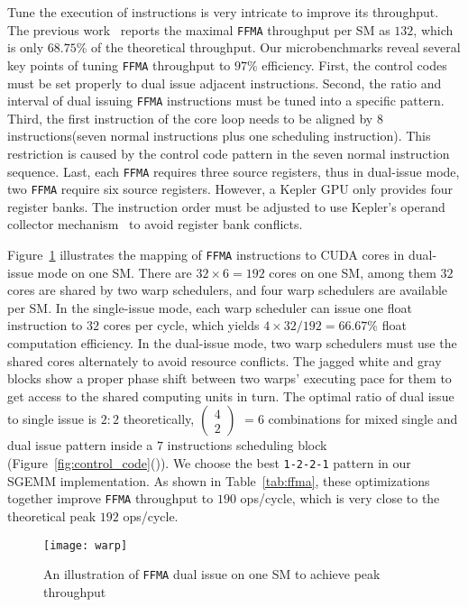 Tune the execution of instructions is very intricate to improve its throughput. 
The previous work~\cite{lai} reports the maximal {\tt FFMA} throughput per SM as $132$, which is only $68.75\%$ of the theoretical throughput. 
Our microbenchmarks reveal several key points of tuning {\tt FFMA} throughput to $97\%$ efficiency.
First, the control codes must be set properly to dual issue adjacent instructions. 
Second, the ratio and interval of dual issuing {\tt FFMA} instructions must be tuned into a specific pattern.
Third, the first instruction of the core loop needs to be aligned by 8 instructions(seven
normal instructions plus one scheduling instruction). This restriction
is caused by the control code pattern in the seven normal instruction sequence.
Last, each {\tt FFMA} requires three source registers, thus in dual-issue mode, two {\tt FFMA} require six source registers.
However, a Kepler GPU only provides four register banks.
The instruction order must be adjusted to use Kepler's operand collector mechanism~\cite{collector,tarjan2012policy} to avoid register bank conflicts. 

Figure~\ref{fig:warp} illustrates the mapping of {\tt FFMA} instructions to
CUDA cores in dual-issue mode on one SM. There are $32\times 6=192$ cores on
one SM, among them $32$ cores are shared by two warp schedulers, and four warp schedulers are available per SM. 
In the single-issue mode, each warp scheduler can issue one float instruction to $32$ cores per cycle, which yields $4\times32/192=66.67\%$ float computation efficiency. 
In the dual-issue mode, two warp schedulers must use the shared cores alternately to avoid resource conflicts.
The jagged white and gray blocks show a proper phase shift between two warps' executing pace for them to get access to the shared computing units in turn.
The optimal ratio of dual issue to single issue is $2:2$ theoretically, 
\( \begin{pmatrix} 4 \\ 2 \end{pmatrix} \) $=6$ combinations for mixed single and dual issue
pattern inside a $7$ instructions scheduling block (Figure~\ref{fig:control_code}()).
We choose the best {\tt 1-2-2-1} pattern in our SGEMM implementation.
As shown in Table~\ref{tab:ffma}, these optimizations together improve {\tt FFMA} throughput to $190$ ops/cycle, which is very close to the theoretical peak $192$ ops/cycle.
\begin{figure}[htbp]
\begin{center}
\texttt{[image: warp]}
    \caption{\small An illustration of {\tt FFMA} dual issue on one SM to achieve peak throughput}
\label{fig:warp}
\end{center}
\end{figure}

